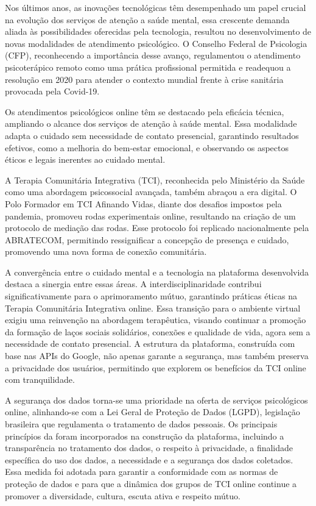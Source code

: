         Nos últimos anos, as inovações tecnológicas têm desempenhado um papel crucial na evolução dos serviços de atenção a saúde mental, essa crescente demanda aliada às possibilidades oferecidas pela tecnologia, resultou no desenvolvimento de novas modalidades de atendimento psicológico. O Conselho Federal de Psicologia (CFP), reconhecendo a importância desse avanço, regulamentou o atendimento psicoterápico remoto como uma prática profissional permitida e readequou a resolução em 2020 para atender o contexto mundial frente à crise sanitária provocada pela Covid-19\cite{CFP}.
        
        Os atendimentos psicológicos online têm se destacado pela eficácia técnica, ampliando o alcance dos serviços de atenção à saúde mental. Essa modalidade adapta o cuidado sem necessidade de contato presencial, garantindo resultados efetivos, como a melhoria do bem-estar emocional, e observando os aspectos éticos e legais inerentes ao cuidado mental\cite{SIEGMUND}.
        
        A Terapia Comunitária Integrativa (TCI), reconhecida pelo Ministério da Saúde como uma abordagem psicossocial avançada, também abraçou a era digital. O Polo Formador em TCI Afinando Vidas, diante dos desafios impostos pela pandemia, promoveu rodas experimentais online, resultando na criação de um protocolo de mediação das rodas. Esse protocolo foi replicado nacionalmente pela ABRATECOM, permitindo ressignificar a concepção de presença e cuidado, promovendo uma nova forma de conexão comunitária\cite{SILVAeOTAVIANO}.
        
        A convergência entre o cuidado mental e a tecnologia na plataforma desenvolvida destaca a sinergia entre essas áreas. A interdisciplinaridade contribui significativamente para o aprimoramento mútuo, garantindo práticas éticas na Terapia Comunitária Integrativa online. Essa transição para o ambiente virtual exigiu uma reinvenção na abordagem terapêutica, visando continuar a promoção da formação de laços sociais solidários, conexões e qualidade de vida, agora sem a necessidade de contato presencial. A estrutura da plataforma, construída com base nas APIs do Google, não apenas garante a segurança, mas também preserva a privacidade dos usuários, permitindo que explorem os benefícios da TCI online com tranquilidade.
        
        A segurança dos dados torna-se uma prioridade na oferta de serviços psicológicos online, alinhando-se com a Lei Geral de Proteção de Dados (LGPD), legislação brasileira que regulamenta o tratamento de dados pessoais. Os principais princípios da \cite{LGPD} foram incorporados na construção da plataforma, incluindo a transparência no tratamento dos dados, o respeito à privacidade, a finalidade específica do uso dos dados, a necessidade e a segurança dos dados coletados. Essa medida foi adotada para garantir a conformidade com as normas de proteção de dados e para que a dinâmica dos grupos de TCI online continue a promover a diversidade, cultura, escuta ativa e respeito mútuo.
        

